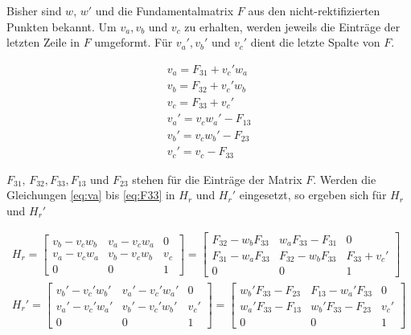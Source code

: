 Bisher sind $w$, $w'$ und die Fundamentalmatrix $F$ aus den nicht-rektifizierten Punkten bekannt. Um $v_a, v_b$ und $v_c$ zu erhalten, werden jeweils die Einträge der letzten Zeile in $F$ umgeformt. Für $v_a', v_b'$ und $v_c'$ dient die letzte Spalte von $F$.


\begin{gather}
	v_a = F_{31}+v_c'w_a\label{eq:va}\\
	v_b = F_{32}+v_c'w_b\\
	v_c = F_{33}+v_c'\\
	v_a' = v_cw_a'-F_{13}\\
	v_b' = v_cw_b'-F_{23}\\
	v_c' = v_c -F_{33}\label{eq:F33}
\end{gather}

$F_{31},\, F_{32}, F_{33} ,F_{13}$ und  $F_{23}$ stehen für die Einträge der Matrix $F$. Werden die Gleichungen \ref{eq:va} bis \ref{eq:F33} in $H_r$ und $H_r'$ eingesetzt, so ergeben sich für $H_r$ und $H_r'$ 


\begin{gather}
		H_r = 
		\begin{bmatrix}
			v_b-v_cw_b&	v_a-v_cw_a&0\\
			v_a-v_cw_a&v_b-v_cw_b&v_c\\
			0&0&1
		\end{bmatrix} = 
	\begin{bmatrix}
		F_{32}-w_bF_{33}&w_aF_{33}-F_{31}&0\\
		F_{31}-w_aF_{33}&F_{32}-w_bF_{33}&F_{33}+v_c'\\
		0&0&1
	\end{bmatrix}\\
	H_r'=
		\begin{bmatrix}
		v_b'-v_c'w_b'&	v_a'-v_c'w_a'&0\\
		v_a'-v_c'w_a'&v_b'-v_c'w_b'&v_c'\\
		0&0&1
	\end{bmatrix}=
	\begin{bmatrix}
		w_b'F_{33}-F_{23}&F_{13}-w_a'F_{33}&0\\
		w_a'F_{33}-F_{13}&w_b'F_{33}-F_{23}&v_c'\\
		0&0&1
	\end{bmatrix}
\end{gather}\\


